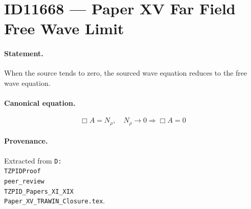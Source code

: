 \section*{ID11668 --- Paper XV Far Field Free Wave Limit}

\paragraph{Statement.}
When the source tends to zero, the sourced wave equation reduces to the free wave equation.

\paragraph{Canonical equation.}
\[
\Box A=N_\rho,\quad N_\rho\to0\Rightarrow\Box A=0
\]

\paragraph{Provenance.}
Extracted from \texttt{D:\\TZPIDProof\\peer\_review\\TZPID\_Papers\_XI\_XIX\\Paper\_XV\_TRAWIN\_Closure.tex}.
